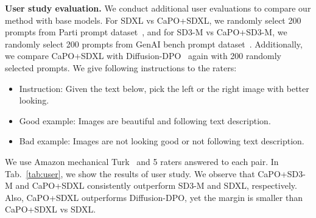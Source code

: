 \vspace{0.2in}
\noindent
{\bf User study evaluation.}
We conduct additional user evaluations to compare our method with base models. For SDXL vs CaPO+SDXL, we randomly select 200 prompts from Parti prompt dataset~\citep{yu2022scaling}, and for SD3-M vs CaPO+SD3-M, we randomly select 200 prompts from GenAI bench prompt dataset~\citep{li2024genai}. Additionally, we compare CaPO+SDXL with Diffusion-DPO~\citep{wallace2023diffusion} again with 200 randomly selected prompts. We give following instructions to the raters:
\begin{itemize}[leftmargin=1cm]
    \item Instruction: Given the text below, pick the left or the right image with better looking.
    \item Good example: Images are beautiful and following text description.
    \item Bad example: Images are not looking good or not following text description.
\end{itemize}
We use Amazon mechanical Turk~\citep{amt} and 5 raters answered to each pair. 
In Tab.~\ref{tab:user}, we show the results of user study. 
We observe that CaPO+SD3-M and CaPO+SDXL consistently outperform SD3-M and SDXL, respectively. Also, CaPO+SDXL outperforms Diffusion-DPO, yet the margin is smaller than CaPO+SDXL vs SDXL.







